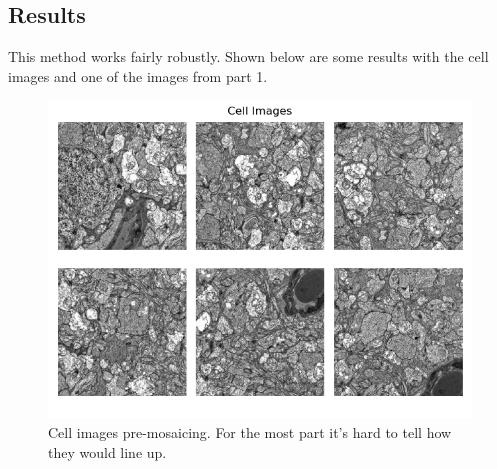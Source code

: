 \documentclass[]{article}
\begin{document}
\subsection{Results}
This method works fairly robustly. Shown below are some results with the cell images and one of the images from part 1.
\begin{figure}[H]
	\centering
	\includegraphics[width=6.5in]{images/cell_images_subplot.png}
	\caption{Cell images pre-mosaicing. For the most part it's hard to tell how they would line up.}
\end{figure}
\end{document}
